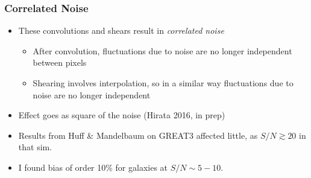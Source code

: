 \documentclass{beamer}
\begin{document}
\frame
{
    \frametitle{Correlated Noise}

 
    \begin{itemize}

        \item These convolutions and shears result in {\em {\color{gold} correlated noise}}
            
        \begin{itemize}
            \item After convolution, fluctuations due to noise are no longer
                independent between pixels

            \item Shearing involves interpolation, so in a similar way fluctuations
                due to noise are no longer independent
        \end{itemize}

    \item Effect goes as {\color{gold} square} of the noise (Hirata 2016, in prep)

        \item Results from Huff \& Mandelbaum on GREAT3 affected little, as
            $S/N \gtrsim 20$ in that sim.

        \item I found bias of order 10\% for galaxies at $S/N \sim 5-10$.



    \end{itemize}

}


%
%
%
%
\end{document}
